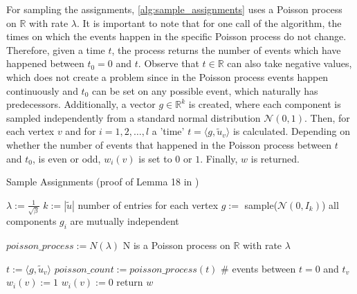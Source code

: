 For sampling the assignments, \cref{alg:sample_assignments} uses a Poisson process on $\mathbb{R}$ with rate $\lambda$. It is important to note that for one call of the algorithm, the times on which the events happen in the specific Poisson process do not change. Therefore, given a time $t$, the process returns the number of events which have happened between $t_0 = 0$ and $t$. Observe that $t\in \mathbb{R}$ can also take negative values, which does not create a problem since in the Poisson process events happen continuously and $t_0$ can be set on any possible event, which naturally has predecessors.
Additionally, a vector $g \in \mathbb{R}^k$ is created, where each component is sampled independently from a standard normal distribution $\mathcal{N}(0,1)$. Then, for each vertex $v$ and for $i = 1, 2, \ldots, l$ a 'time' $t = \langle g, \tilde{u}_v \rangle $ is calculated.
Depending on whether the number of events that happened in the Poisson process between $t$ and $t_0$, is even or odd, $w_i(v)$ is set to $0$ or $1$. Finally, $w$ is returned.

\begin{algorithm}[htpb]
	\caption{Sample Assignments (proof of Lemma 18 in \cite{LouisM14}) \label{alg:sample_assignments}} 
	\begin{algorithmic}
		\State $\lambda := \frac{1}{\sqrt{\beta}}$
		\State $k:= |\tilde{u}|$ \Comment number of entries for each vertex
		\State $g:=$ sample($\mathcal{N}(0,I_k)$) \Comment all components $g_i$ are mutually independent 
		
		\State $poisson\_process := N(\lambda)$ \Comment N is a Poisson process on $\mathbb{R}$ with rate $\lambda$
		
		
		
		\State $t := \langle g, \tilde{u}_v \rangle $
		\State $poisson\_count := poisson\_process(t)$ \Comment \# events between $t=0$ and $t_v$
		\State $w_i(v) := 1$
		\Else
		\State  $w_i(v) := 0$
		\EndIf
		\EndFor
		\EndFor
		\State return $w$
		\EndFunction %
	\end{algorithmic}
\end{algorithm}	


